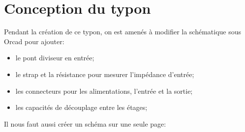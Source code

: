 \chapter{Conception du typon}
Pendant la création de ce typon, on est amenés à modifier la schématique sous Orcad pour ajouter:
\begin{itemize}
    \item le pont diviseur en entrée;
    \item le strap et la résistance pour mesurer l’impédance d’entrée;
    \item les connecteurs pour les alimentations, l’entrée et la sortie;
    \item les capacités de découplage entre les étages;
\end{itemize}

Il nous faut aussi créer un schéma sur une seule page:

